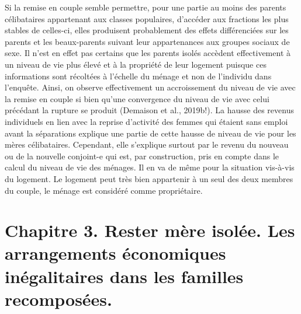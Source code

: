 \documentclass[
  12pt,
]{book}
\begin{document}
Si la remise en couple semble permettre, pour une partie au moins des
parents célibataires appartenant aux classes populaires, d'accéder aux
fractions les plus stables de celles-ci, elles produisent probablement
des effets différenciées sur les parents et les beaux-parents suivant
leur appartenances aux groupes sociaux de sexe. Il n'est en effet pas
certains que les parents isolés accèdent effectivement à un niveau de
vie plus élevé et à la propriété de leur logement puisque ces
informations sont récoltées à l'échelle du ménage et non de l'individu
dans l'enquête. Ainsi, on observe effectivement un accroissement du
niveau de vie avec la remise en couple si bien qu'une convergence du
niveau de vie avec celui précédant la rupture se produit (Demaison et
al., 2019b!). La hausse des revenus individuels en lien avec la reprise
d'activité des femmes qui étaient sans emploi avant la séparations
explique une partie de cette hausse de niveau de vie pour les mères
célibataires. Cependant, elle s'explique surtout par le revenu du
nouveau ou de la nouvelle conjoint-e qui est, par construction, pris en
compte dans le calcul du niveau de vie des ménages. Il en va de même
pour la situation vis-à-vis du logement. Le logement peut très bien
appartenir à un seul des deux membres du couple, le ménage est considéré
comme propriétaire.

\chapter{Chapitre 3. Rester mère isolée. Les arrangements économiques
inégalitaires dans les familles
recomposées.}\label{chapitre-3.-rester-muxe8re-isoluxe9e.-les-arrangements-uxe9conomiques-inuxe9galitaires-dans-les-familles-recomposuxe9es.}
\end{document}
